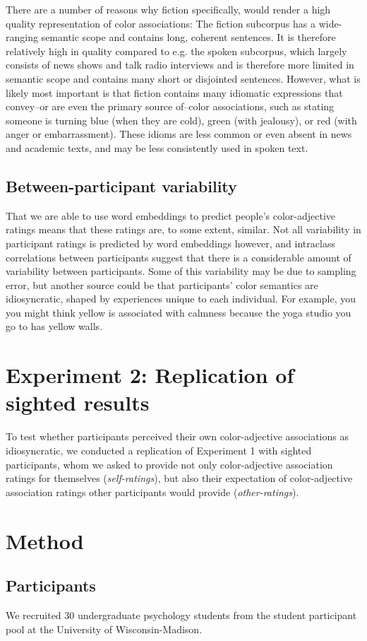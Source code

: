 \documentclass[10pt,letterpaper]{article}
\begin{document}
There are a number of reasons why fiction specifically, would render a high quality representation of color associations: The fiction subcorpus has a wide-ranging semantic scope and contains long, coherent sentences. It is therefore relatively high in quality compared to e.g. the spoken subcorpus, which largely consists of news shows and talk radio interviews and is therefore more limited in semantic scope and contains many short or disjointed sentences. However, what is likely most important is that fiction contains many idiomatic expressions that convey--or are even the primary source of--color associations, such as stating someone is turning blue (when they are cold), green (with jealousy), or red (with anger or embarrassment). These idioms are less common or even absent in news and academic texts, and may be less consistently used in spoken text.

\subsection{Between-participant variability}
That we are able to use word embeddings to predict people's color-adjective ratings means that these ratings are, to some extent, similar. Not all variability in participant ratings is predicted by word embeddings however, and intraclass correlations between participants suggest that there is a considerable amount of variability between participants. Some of this variability may be due to sampling error, but another source could be that participants' color semantics are idiosyncratic, shaped by experiences unique to each individual. For example, you you might think yellow is associated with calmness because the yoga studio you go to has yellow walls.


\section{Experiment 2: Replication of sighted results}
To test whether participants perceived their own color-adjective associations as idiosyncratic, we conducted a replication of Experiment 1 with sighted participants, whom we asked to provide not only color-adjective association ratings for themselves (\emph{self-ratings}), but also their expectation of color-adjective association ratings other participants would provide (\emph{other-ratings}).
\section{Method}
\subsection{Participants}
We recruited 30 undergraduate psychology students from the student participant pool at the University of Wisconsin-Madison.
\end{document}
